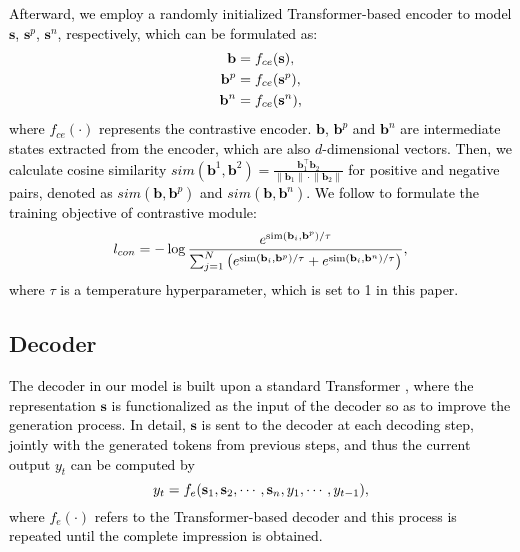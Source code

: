 \documentclass[11pt]{article}
\begin{document}
\textcolor{black}{
Afterward, we employ a randomly initialized Transformer-based encoder to model $\mathbf{s}$, $\mathbf{s}^{p}$, $\mathbf{s}^{n}$, respectively, which can be formulated as:
\begin{align}
\setlength\abovedisplayskip{6pt}
\setlength\belowdisplayskip{6pt}
    \mathbf{b}  &= f_{ce}(\mathbf{s}), \\
    \mathbf{b}^{p} &= f_{ce}(\mathbf{s}^{p}), \\
    \mathbf{b}^{n} &= f_{ce}(\mathbf{s}^{n}),
    \label{eq:cl-encoder}
\end{align}
%
where $f_{ce}(\cdot)$ represents the contrastive encoder.
%
$\mathbf{b}$, $\mathbf{b}^{p}$ and $\mathbf{b}^{n}$ are intermediate states extracted from the encoder, which are also $d$-dimensional vectors. 
%
Then, we calculate cosine similarity $sim(\mathbf{b}^{1},\mathbf{b}^{2}) = \frac{\mathbf{b}_{1}^{\top} \mathbf{b}_{2}}{\left\|\mathbf{b}_{1}\right\| \cdot\left\|\mathbf{b}_{2}\right\|}$ for positive and negative pairs, denoted as $sim(\mathbf{b},\mathbf{b}^{p})$ and $sim(\mathbf{b},\mathbf{b}^{n})$.
%
We follow  to formulate the training objective of contrastive module:
%
\begin{equation}
\setlength\abovedisplayskip{5pt}
\setlength\belowdisplayskip{5pt}
    l_{con} = -\log \frac{e^{\operatorname{sim}\left(\mathbf{b}_{i}, \mathbf{b}^{p}\right) / \tau}}{\sum_{j=1}^{N}\left(e^{\operatorname{sim}\left(\mathbf{b}_{i}, \mathbf{b}^{p}\right) / \tau}+e^{\operatorname{sim}\left(\mathbf{b}_{i}, \mathbf{b}^{n}\right) / \tau}\right)},
\end{equation}
where $\tau$ is a temperature hyperparameter, which is set to 1 in this paper.
%
}

\subsection{Decoder}
\textcolor{black}{
The decoder in our model is built upon a standard Transformer \cite{vaswani2017attention}, where the representation $\mathbf{s}$ is functionalized as the input of the decoder so as to improve the generation process.
%
In detail, $\mathbf{s}$ is sent to the decoder at each decoding step, jointly with the generated tokens from previous steps, and thus the current output $y_{t}$ can be computed by
%
\begin{equation}
\setlength\abovedisplayskip{5pt}
\setlength\belowdisplayskip{5pt}
    y_{t} = f_e(\mathbf{s}_{1},\mathbf{s}_{2},\cdots,\mathbf{s}_{n},y_{1},\cdots,y_{t-1}),
\end{equation}
where $f_e(\cdot)$ refers to the Transformer-based decoder and this process is repeated until the complete impression is obtained.
}
\end{document}
